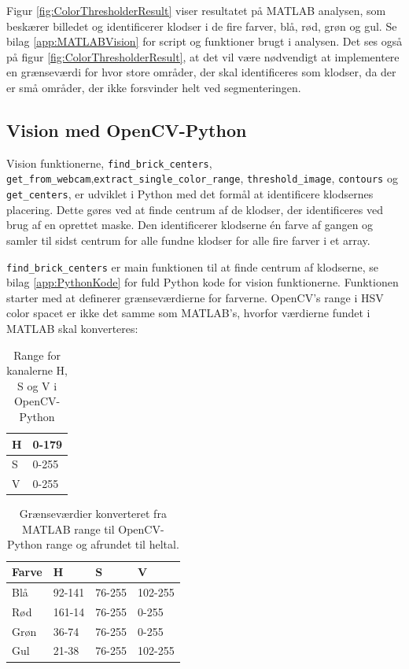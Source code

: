 Figur \vref{fig:ColorThresholderResult} viser resultatet på MATLAB analysen, som beskærer billedet og identificerer klodser i de fire farver, blå, rød, grøn og gul.
Se bilag \vref{app:MATLABVision} for script og funktioner brugt i analysen.
Det ses også på figur \ref{fig:ColorThresholderResult}, at det vil være nødvendigt at implementere en grænseværdi for hvor store områder, der skal identificeres som klodser, da der er små områder, der ikke forsvinder helt ved segmenteringen.


\subsection{Vision med OpenCV-Python}
Vision funktionerne, \texttt{find\_brick\_centers}, \texttt{get\_from\_webcam},\newline \texttt{extract\_single\_color\_range}, \texttt{threshold\_image}, \texttt{contours} og \texttt{get\_centers}, er udviklet i Python med det formål at identificere klodsernes placering.
Dette gøres ved at finde centrum af de klodser, der identificeres ved brug af en oprettet maske.
Den identificerer klodserne én farve af gangen og samler til sidst centrum for alle fundne klodser for alle fire farver i et array.

\texttt{find\_brick\_centers} er main funktionen til at finde centrum af klodserne, se bilag \vref{app:PythonKode} for fuld Python kode for vision funktionerne.
Funktionen starter med at definerer grænseværdierne for farverne.
OpenCV's range i HSV color spacet er ikke det samme som MATLAB's, hvorfor værdierne fundet i MATLAB skal konverteres:
\begin{table}[H]
\centering
\begin{tabular}{l|l}
H		&	0-179\\
\hline
S		&	0-255\\
\hline
V		&	0-255\\
\end{tabular}	
\caption{Range for kanalerne H, S og V i OpenCV-Python}
\end{table}

\begin{table}[H]
\centering
\begin{tabular}{l|l|l|l}
Farve	&	H			&	S			&	V	\\
\hline
Blå		&	92-141		&	76-255	&	102-255	\\
Rød		&	161-14		&	76-255	&	0-255	\\
Grøn	&	36-74		&	76-255	&	0-255	\\
Gul		&	21-38		&	76-255	&	102-255	\\
\end{tabular}	
\caption{Grænseværdier konverteret fra MATLAB range til OpenCV-Python range og afrundet til heltal.}
\end{table}

